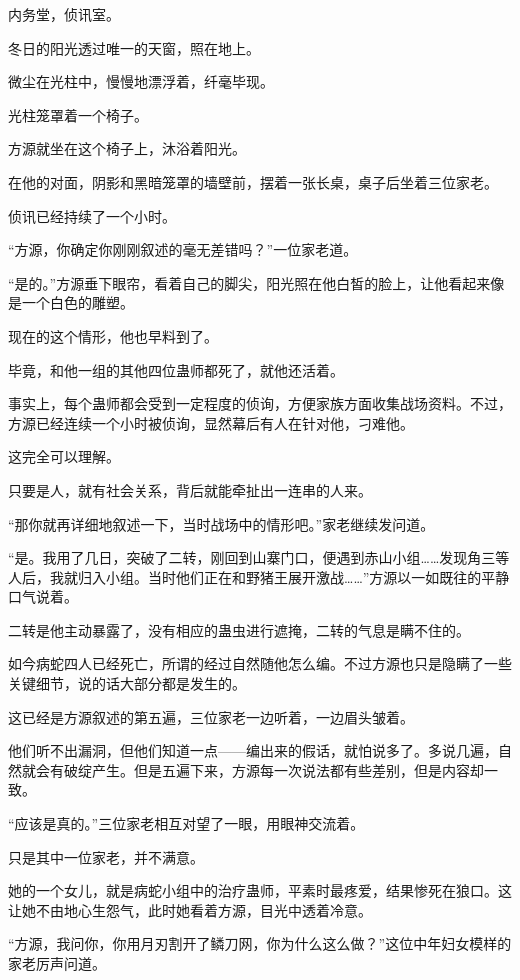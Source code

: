 
\begin{this_body}

内务堂，侦讯室。

冬日的阳光透过唯一的天窗，照在地上。

微尘在光柱中，慢慢地漂浮着，纤毫毕现。

光柱笼罩着一个椅子。

方源就坐在这个椅子上，沐浴着阳光。

在他的对面，阴影和黑暗笼罩的墙壁前，摆着一张长桌，桌子后坐着三位家老。

侦讯已经持续了一个小时。

“方源，你确定你刚刚叙述的毫无差错吗？”一位家老道。

“是的。”方源垂下眼帘，看着自己的脚尖，阳光照在他白皙的脸上，让他看起来像是一个白色的雕塑。

现在的这个情形，他也早料到了。

毕竟，和他一组的其他四位蛊师都死了，就他还活着。

事实上，每个蛊师都会受到一定程度的侦询，方便家族方面收集战场资料。不过，方源已经连续一个小时被侦询，显然幕后有人在针对他，刁难他。

这完全可以理解。

只要是人，就有社会关系，背后就能牵扯出一连串的人来。

“那你就再详细地叙述一下，当时战场中的情形吧。”家老继续发问道。

“是。我用了几日，突破了二转，刚回到山寨门口，便遇到赤山小组……发现角三等人后，我就归入小组。当时他们正在和野猪王展开激战……”方源以一如既往的平静口气说着。

二转是他主动暴露了，没有相应的蛊虫进行遮掩，二转的气息是瞒不住的。

如今病蛇四人已经死亡，所谓的经过自然随他怎么编。不过方源也只是隐瞒了一些关键细节，说的话大部分都是发生的。

这已经是方源叙述的第五遍，三位家老一边听着，一边眉头皱着。

他们听不出漏洞，但他们知道一点——编出来的假话，就怕说多了。多说几遍，自然就会有破绽产生。但是五遍下来，方源每一次说法都有些差别，但是内容却一致。

“应该是真的。”三位家老相互对望了一眼，用眼神交流着。

只是其中一位家老，并不满意。

她的一个女儿，就是病蛇小组中的治疗蛊师，平素时最疼爱，结果惨死在狼口。这让她不由地心生怨气，此时她看着方源，目光中透着冷意。

“方源，我问你，你用月刃割开了鳞刀网，你为什么这么做？”这位中年妇女模样的家老厉声问道。


\end{this_body}
